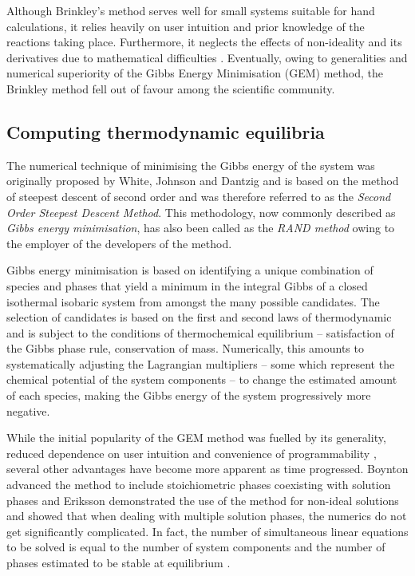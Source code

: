 	Although Brinkley's method serves well for small systems suitable for hand calculations, it relies heavily on user intuition and prior knowledge of the reactions taking place. Furthermore, it neglects the effects of non-ideality and its derivatives due to mathematical difficulties \cite{Zeleznik:1968aa}. Eventually, owing to generalities and numerical superiority of the Gibbs Energy Minimisation (GEM) method, the Brinkley method fell out of favour among the scientific community.

	\subsection{Computing thermodynamic equilibria}
	The numerical technique of minimising the Gibbs energy of the system was originally proposed by White, Johnson and Dantzig \cite{White:58} and is based on the method of steepest descent of second order and was therefore referred to as the \emph{Second Order Steepest Descent Method}. This methodology, now commonly described as \emph{Gibbs energy minimisation}, has also been called as the \emph{RAND method} owing to the employer of the developers of the method.

	Gibbs energy minimisation is based on identifying a unique combination of species and phases that yield a minimum in the integral Gibbs of a closed isothermal isobaric system from amongst the many possible candidates. The selection of candidates is based on the first and second laws of thermodynamic and is subject to the conditions of thermochemical equilibrium -- satisfaction of the Gibbs phase rule, conservation of mass. Numerically, this amounts to systematically adjusting the Lagrangian multipliers -- some which represent the chemical potential of the system components -- to change the estimated amount of each species, making the Gibbs energy of the system progressively more negative.

	While the initial popularity of the GEM method was fuelled by its generality,  reduced dependence on user intuition and convenience of programmability \cite{Zeleznik:1968aa}, several other advantages have become more apparent as time progressed. Boynton advanced the method to include stoichiometric phases coexisting with solution phases \cite{Boynton:1960aa} and Eriksson \cite{Eriksson:1975aa} demonstrated the use of the method for non-ideal solutions and showed that when dealing with multiple solution phases, the numerics do not get significantly complicated. In fact, the number of simultaneous linear equations to be solved is equal to the number of system components and the number of phases estimated to be stable at equilibrium \cite{vanZeggeren11,Boynton:1960aa,Eriksson:1975aa,Eriksson73}.

